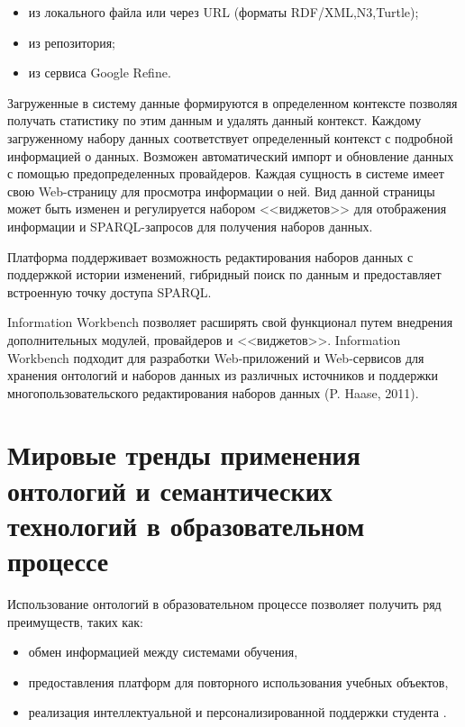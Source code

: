 \begin{itemize}
\item из локального файла или через URL (форматы RDF/XML,N3,Turtle);
\item из репозитория;
\item из сервиса Google Refine.
\end{itemize}

Загруженные в систему данные формируются в определенном контексте позволяя получать статистику по этим данным и удалять данный контекст. Каждому загруженному набору данных соответствует определенный контекст с подробной информацией о данных. Возможен автоматический импорт и обновление данных с помощью предопределенных провайдеров.
Каждая сущность в системе имеет свою Web-страницу для просмотра информации о ней. Вид данной страницы может быть изменен и регулируется набором <<виджетов>> для отображения информации и SPARQL-запросов для получения наборов данных.

Платформа поддерживает возможность редактирования наборов данных с поддержкой истории изменений, гибридный поиск по данным и предоставляет встроенную точку доступа SPARQL. 

Information Workbench позволяет расширять свой функционал путем внедрения дополнительных  модулей, провайдеров и <<виджетов>>. Information Workbench подходит для разработки Web-приложений и Web-сервисов для хранения онтологий и наборов данных из различных источников и поддержки многопользовательского редактирования наборов данных (P. Haase, 2011). 






\section{Мировые тренды применения онтологий и семантических технологий в образовательном процессе} \label{sect1_6}

Использование онтологий в образовательном процессе позволяет получить ряд преимуществ, таких как:
\begin{itemize}
\item обмен информацией между системами обучения, 
\item предоставления платформ для повторного использования учебных объектов,
\item реализация интеллектуальной и персонализированной поддержки студента \cite{gaeta2011ontology}.
\end{itemize}

